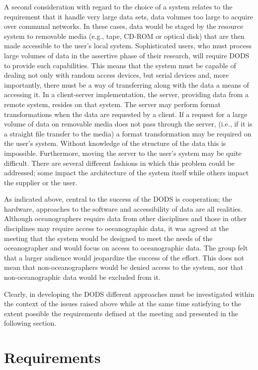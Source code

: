 A second consideration with regard to the choice of a system relates to the
requirement that it handle very large data sets, data volumes too large to
acquire over communal networks. In these cases, data would be staged by the
resource system to removable media (e.g., tape, CD-ROM or optical disk) that
are then made accessible to the user's local system.  Sophisticated users,
who must process large volumes of data in the assertive phase of their
research, will require DODS to provide such capabilities. This means that the
system must be capable of dealing not only with random access devices, but
serial devices and, more importantly, there must be a way of transferring
along with the data a means of accessing it. In a client-server
implementation, the server, providing data from a remote system, resides on
that system. The server may perform format transformations when the data are
requested by a client. If a request for a large volume of data on removable
media does not pass through the server, (i.e., if it is a straight file
transfer to the media) a format transformation may be required on the user's
system. Without knowledge of the structure of the data this is impossible.
Furthermore, moving the server to the user's system may be quite
difficult. There are several different fashions in which this problem could
be addressed; some impact the architecture of the system itself while others
impact the supplier or the user.

As indicated above, central to the success of the DODS is cooperation; 
the hardware, approaches to the software and accessibility of data are 
all realities. Although oceanographers require data from other 
disciplines and those in other disciplines may require access to 
oceanographic data, it was agreed at the meeting that the system would 
be designed to meet the needs of the oceanographer and would focus on 
access to oceanographic data. The group felt that a larger audience 
would jeopardize the success of the effort. This does not mean that 
non-oceanographers would be denied access to the system, nor that 
non-oceanographic data would be excluded from it.

Clearly, in developing the DODS different approaches must be investigated
within the context of the issues raised above while at the same time
satisfying to the extent possible the requirements defined at the meeting and
presented in the following section.

\section{\bf Requirements}

